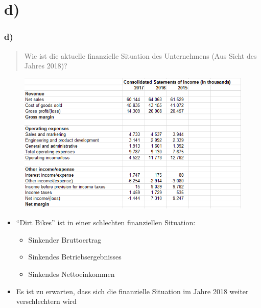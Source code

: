 \documentclass{beamer}
\begin{document}
\section{d)}
\begin{frame}
\frametitle{d)}

\begin{quote}
Wie ist die aktuelle finanzielle Situation des Unternehmens (Aus Sicht des Jahres 2018)?
\end{quote}

\begin{figure}
\includegraphics[scale=0.34]{financials.PNG}
\end{figure}

\begin{itemize}
\setlength{\itemsep}{14pt}
\item ``Dirt Bikes'' ist in einer schlechten finanziellen Situation:
\begin{itemize}
\item Sinkender Bruttoertrag
\item Sinkendes Betriebsergebnisses
\item Sinkendes Nettoeinkommen
\end{itemize}
\item Es ist zu erwarten, dass sich die finanzielle Situation im Jahre 2018 weiter verschlechtern wird
\end{itemize}

\end{frame}
\end{document}
